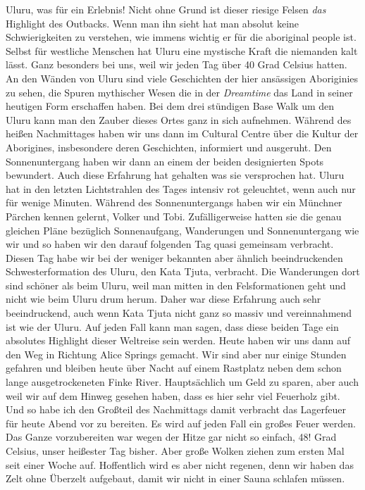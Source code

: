 \documentclass[11pt]{book}
\begin{document}
Uluru, was für ein Erlebnis! Nicht ohne Grund ist dieser riesige Felsen \emph{das} Highlight des Outbacks. Wenn man ihn sieht hat 
man absolut keine Schwierigkeiten zu verstehen, wie immens wichtig er für die aboriginal people ist. Selbst für westliche Menschen 
hat Uluru eine mystische Kraft die niemanden kalt lässt. Ganz besonders bei uns, weil wir jeden Tag über 40 Grad Celsius hatten. 
An den Wänden von Uluru sind viele Geschichten der hier ansässigen Aboriginies zu sehen, die Spuren mythischer Wesen die in der 
\emph{Dreamtime} das Land in seiner heutigen Form erschaffen haben. Bei dem drei stündigen Base Walk um den Uluru kann man den Zauber 
dieses Ortes ganz in sich aufnehmen. Während des heißen Nachmittages haben wir uns dann im Cultural Centre über die Kultur der 
Aborigines, insbesondere deren Geschichten, informiert und ausgeruht. Den Sonnenuntergang haben wir dann an einem der beiden 
designierten Spots bewundert. Auch diese Erfahrung hat gehalten was sie versprochen hat. Uluru hat in den letzten Lichtstrahlen des 
Tages intensiv rot geleuchtet, wenn auch nur für wenige Minuten. Während des Sonnenuntergangs haben wir ein Münchner Pärchen 
kennen gelernt, Volker und Tobi. Zufälligerweise hatten sie die genau gleichen Pläne bezüglich Sonnenaufgang, Wanderungen und 
Sonnenuntergang wie wir und so haben wir den darauf folgenden Tag quasi gemeinsam verbracht. Diesen Tag habe wir bei der weniger 
bekannten aber ähnlich beeindruckenden Schwesterformation des Uluru, den Kata Tjuta, verbracht. Die Wanderungen dort sind schöner 
als beim Uluru, weil man mitten in den Felsformationen geht und nicht wie beim Uluru drum herum. Daher war diese Erfahrung auch sehr
beeindruckend, auch wenn Kata Tjuta nicht ganz so massiv und vereinnahmend ist wie der Uluru. Auf jeden Fall kann man sagen, 
dass diese beiden Tage ein absolutes Highlight dieser Weltreise sein werden. 
Heute haben wir uns dann auf den Weg in Richtung Alice Springs gemacht. Wir sind aber nur einige Stunden gefahren und bleiben 
heute über Nacht auf einem Rastplatz neben dem schon lange ausgetrockeneten Finke River. Hauptsächlich um Geld zu sparen, aber auch 
weil wir auf dem Hinweg gesehen haben, dass es hier sehr viel Feuerholz gibt. Und so habe ich den Großteil des Nachmittags damit 
verbracht das Lagerfeuer für heute Abend vor zu bereiten. Es wird auf jeden Fall ein großes Feuer werden. Das Ganze vorzubereiten war 
wegen der Hitze gar nicht so einfach, 48! Grad Celsius, unser heißester Tag bisher. Aber große Wolken ziehen zum ersten Mal seit
einer Woche auf. Hoffentlich wird es aber nicht regenen, denn wir haben das Zelt ohne Überzelt aufgebaut, damit wir nicht in 
einer Sauna schlafen müssen.
\end{document}
